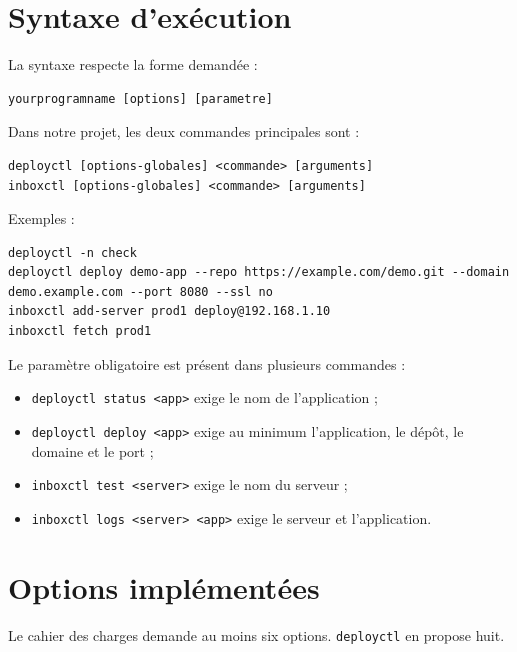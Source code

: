 \documentclass[12pt,a4paper]{article}
\begin{document}
\section{Syntaxe d'exécution}

La syntaxe respecte la forme demandée :

\begin{lstlisting}
yourprogramname [options] [parametre]
\end{lstlisting}

Dans notre projet, les deux commandes principales sont :

\begin{lstlisting}
deployctl [options-globales] <commande> [arguments]
inboxctl [options-globales] <commande> [arguments]
\end{lstlisting}

Exemples :

\begin{lstlisting}
deployctl -n check
deployctl deploy demo-app --repo https://example.com/demo.git --domain demo.example.com --port 8080 --ssl no
inboxctl add-server prod1 deploy@192.168.1.10
inboxctl fetch prod1
\end{lstlisting}

Le paramètre obligatoire est présent dans plusieurs commandes :
\begin{itemize}[leftmargin=*]
  \item \texttt{deployctl status <app>} exige le nom de l'application ;
  \item \texttt{deployctl deploy <app>} exige au minimum l'application, le dépôt, le domaine et le port ;
  \item \texttt{inboxctl test <server>} exige le nom du serveur ;
  \item \texttt{inboxctl logs <server> <app>} exige le serveur et l'application.
\end{itemize}

\section{Options implémentées}

Le cahier des charges demande au moins six options. \texttt{deployctl} en propose huit.
\end{document}

